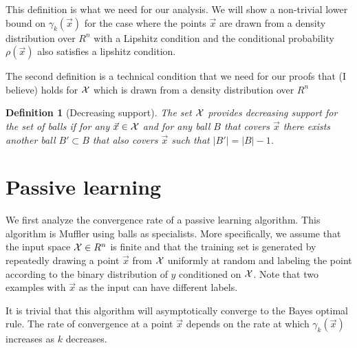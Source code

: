 \documentclass{article}
\newtheorem{definition}[theorem]{Definition}
\newcommand{\X}{{\cal X}}
\newcommand{\x}{\vec{x}}
\newcommand{\y}{\vec{y}}
\begin{document}
This definition is what we need for our analysis. We will show a
non-trivial lower bound on $\gamma_k(\x)$ for the case where the
points $\x$ are drawn from a density distribution over $R^n$ with a
Lipshitz condition and the conditional probability $\rho(\x)$ also
satisfies a lipshitz condition.


The second definition is a technical condition that we need for our
proofs that (I believe) holds for $\X$ which is drawn from a density
distribution over $R^n$
\begin{definition}[Decreasing support]
The set $\X$ provides decreasing support for the set of balls if for
any $\x \in \X$ and for any ball $B$ that covers $\x$ there exists
another ball $B' \subset B$ that also covers $\x$ such that $|B'| = |B|-1$.
\end{definition}

\iffalse
We assume that $\rho$ is Lipschitz
with parameter $\alpha$, i.e. for any two vectors $\vec{x}\neq\vec{y}$.

$$\frac{\rho(\x)-\rho(\y)}{\|\x-\y\|_2} \leq \alpha$$
\fi

\section{Passive learning}

We first analyze the convergence rate of a passive learning algorithm.
This algorithm is Muffler using balls as specialists. More
specifically, we assume that the input space $\X \in R^n$ is finite
and that the training set is generated by repeatedly drawing a point
$\x$ from $\X$ uniformly at random and labeling the point according
to the binary distribution of $y$ conditioned on $\X$. Note that two
examples with $\x$ as the input can have different labels.

It is trivial that this algorithm will asymptotically converge to the
Bayes optimal rule. The rate of convergence at a point $\x$ depends on 
the rate at which $\gamma_k(\x)$ increases as $k$ decreases.

\iffalse
Our analysis consists of two parts:
\begin{itemize}
\item {\bf Sampling and convergence:} In this part we use large
  deviation bounds to compute a confidence interval for the bias of
  each ball. The length of the confidence interval is not uniform and
  is a function of the number of examples
  
\end{itemize}
\fi
\end{document}
